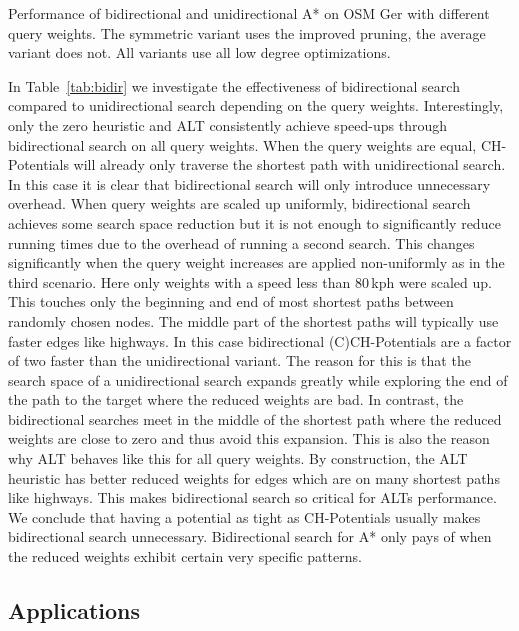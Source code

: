 \documentclass[manuscript,review]{acmart}
\begin{document}
\begin{table}
\centering
\caption{
Performance of bidirectional and unidirectional A* on OSM Ger with different query weights.
The symmetric variant uses the improved pruning, the average variant does not.
All variants use all low degree optimizations.
}\label{tab:bidir}

\end{table}

In Table~\ref{tab:bidir} we investigate the effectiveness of bidirectional search compared to unidirectional search depending on the query weights.
Interestingly, only the zero heuristic and ALT consistently achieve speed-ups through bidirectional search on all query weights.
When the query weights are equal, CH-Potentials will already only traverse the shortest path with unidirectional search.
In this case it is clear that bidirectional search will only introduce unnecessary overhead.
When query weights are scaled up uniformly, bidirectional search achieves some search space reduction but it is not enough to significantly reduce running times due to the overhead of running a second search.
This changes significantly when the query weight increases are applied non-uniformly as in the third scenario.
Here only weights with a speed less than 80\,kph were scaled up.
This touches only the beginning and end of most shortest paths between randomly chosen nodes.
The middle part of the shortest paths will typically use faster edges like highways.
In this case bidirectional (C)CH-Potentials are a factor of two faster than the unidirectional variant.
The reason for this is that the search space of a unidirectional search expands greatly while exploring the end of the path to the target where the reduced weights are bad.
In contrast, the bidirectional searches meet in the middle of the shortest path where the reduced weights are close to zero and thus avoid this expansion.
This is also the reason why ALT behaves like this for all query weights.
By construction, the ALT heuristic has better reduced weights for edges which are on many shortest paths like highways.
This makes bidirectional search so critical for ALTs performance.
We conclude that having a potential as tight as CH-Potentials usually makes bidirectional search unnecessary.
Bidirectional search for A* only pays of when the reduced weights exhibit certain very specific patterns.

\subsection{Applications}
\end{document}
